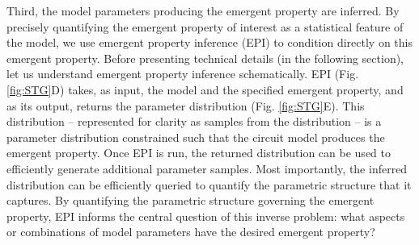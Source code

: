 \documentclass[11pt]{article}
\begin{document}

Third, the model parameters producing the emergent property are inferred.
By precisely quantifying the emergent property of interest as a statistical feature of the model, we use emergent property inference (EPI) to condition directly on this emergent property.
Before presenting technical details (in the following section), let us understand emergent property inference schematically.
EPI (Fig. \ref{fig:STG}D) takes, as input, the model and the specified emergent property, and as its output, returns the parameter distribution (Fig. \ref{fig:STG}E).  
This distribution -- represented for clarity as samples from the distribution -- is a parameter distribution constrained such that the circuit model produces the emergent property. 
Once EPI is run, the returned distribution can be used to efficiently generate additional parameter samples.
Most importantly, the inferred distribution can be efficiently queried to quantify the parametric structure that it captures.
By quantifying the parametric structure governing the emergent property, EPI  informs the central question of this inverse problem: what aspects or combinations of model parameters have the desired emergent property?
\end{document}
